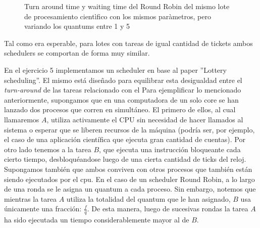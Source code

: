 \begin{figure}
\hfill
{}
\hfill
{}
\hfill
\caption{Turn around time y waiting time del Round Robin del mismo lote de procesamiento cientìfico con los mismos paràmetros,
	pero variando los quantums entre 1 y 5}
\end{figure}

Tal como era esperable, para lotes con tareas de igual cantidad de tickets ambos schedulers se comportan de forma muy similar.

\FloatBarrier


En el ejercicio 5 implementamos un scheduler en base al paper ''Lottery scheduling''. El mismo está diseñado para equilibrar esta desigualdad entre el \emph{turn-around} de las tareas relacionado con el
Para ejemplificar lo mencionado anteriormente, supongamos que en una computadora de un solo core se han lanzado dos procesos que corren en simultáneo. El primero de ellos, al cual llamaremos $A$, utiliza
activamente el CPU sin necesidad de hacer llamados al sistema o esperar que se liberen recursos de la máquina (podría ser, por ejemplo, el caso de una aplicación científica que ejecuta gran cantidad de 
cuentas). Por otro lado tenemos a la tarea $B$, que ejecuta una instrucción bloqueante cada cierto tiempo, desbloquéandose luego de una cierta cantidad de ticks del reloj. Supongamos también que ambos conviven
con otros procesos que también están siendo ejecutados por el cpu. En el caso de un scheduler Round Robin, a lo largo de una ronda se le asigna un quantum a cada proceso. Sin embargo, notemos que mientras
la tarea $A$ utiliza la totalidad del quantum que le han asignado, $B$ usa únicamente una fracción: $\frac{f}{q}$. De esta manera, luego de sucesivas rondas la tarea $A$ ha sido ejecutada un tiempo
considerablemente mayor al de $B$.


